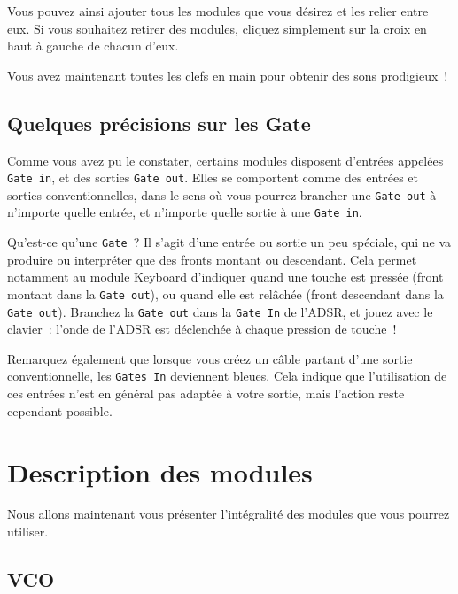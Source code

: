 \documentclass[a4paper,oneside,frenchb,10pt]{article}
\begin{document}
Vous pouvez ainsi ajouter tous les modules que vous désirez et les
relier entre eux. Si vous souhaitez retirer des modules, cliquez
simplement sur la croix en haut à gauche de chacun d'eux.

Vous avez maintenant toutes les clefs en main pour obtenir des sons
prodigieux~!

\subsection{Quelques précisions sur les Gate}

Comme vous avez pu le constater, certains modules disposent d'entrées
appelées \verb!Gate in!, et des sorties \verb!Gate out!. Elles se
comportent comme des entrées et sorties conventionnelles, dans le sens
où vous pourrez brancher une \verb!Gate out! à n'importe quelle entrée,
et n'importe quelle sortie à une \verb!Gate in!.

Qu'est-ce qu'une \verb!Gate!~? Il s'agit d'une entrée ou sortie un peu
spéciale, qui ne va produire ou interpréter que des fronts montant ou
descendant. Cela permet notamment au module Keyboard d'indiquer quand
une touche est pressée (front montant dans la \verb!Gate out!), ou quand
elle est relâchée (front descendant dans la \verb!Gate out!). Branchez
la \verb!Gate out! dans la \verb!Gate In! de l'ADSR, et jouez avec le
clavier~: l'onde de l'ADSR est déclenchée à chaque pression de touche~!

Remarquez également que lorsque vous créez un câble partant d'une sortie
conventionnelle, les \verb!Gates In! deviennent bleues. Cela indique que
l'utilisation de ces entrées n'est en général pas adaptée à votre
sortie, mais l'action reste cependant possible.

\section{Description des modules}

Nous allons maintenant vous présenter l'intégralité des modules que vous
pourrez utiliser.

\subsection{VCO}
\end{document}
